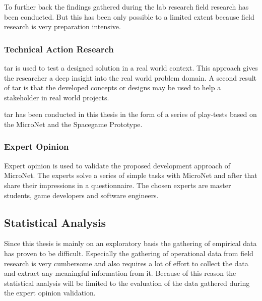 To further back the findings gathered during the lab research field research has
been conducted. But this has been only possible to a limited extent because
field research is very preparation intensive. 

\subsubsection{Technical Action Research}

\gls{tar} is used to test a designed solution in a real world context. This
approach gives the researcher a deep insight into the real world problem domain.
A second result of \gls{tar} is that the developed concepts or designs may be
used to help a stakeholder in real world projects.

\gls{tar} has been conducted in this thesis in the form of a series of
play-tests based on the MicroNet and the Spacegame Prototype.

\subsubsection{Expert Opinion}

Expert opinion is used to validate the proposed development approach of
MicroNet. The experts solve a series of simple tasks with MicroNet and after
that share their impressions in a questionnaire. The chosen experts are master
students, game developers and software engineers.

\subsection{Statistical Analysis}

Since this thesis is mainly on an exploratory basis the gathering of empirical
data has proven to be difficult. Especially the gathering of operational data from
field research is very cumbersome and also requires a lot of effort to collect
the data and extract any meaningful information from it. Because of this
reason the statistical analysis will be limited to the evaluation of the data
gathered during the expert opinion validation.






